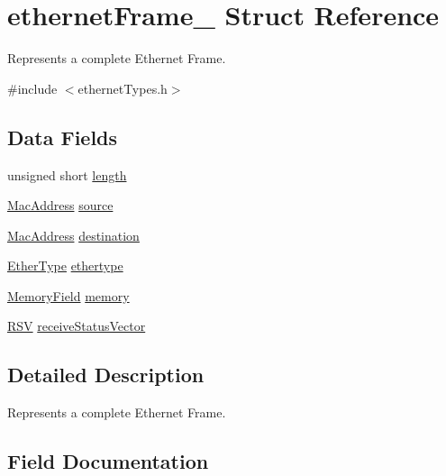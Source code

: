 \hypertarget{structethernet_frame__}{}\section{ethernet\+Frame\+\_\+ Struct Reference}
\label{structethernet_frame__}


Represents a complete Ethernet Frame.  




{\ttfamily \#include $<$ethernet\+Types.\+h$>$}

\subsection*{Data Fields}
\begin{DoxyCompactItemize}
\item 
unsigned short \mbox{\hyperlink{structethernet_frame___a92fb67cb6d873cedc8c09a2d901396a2}{length}}
\item 
\mbox{\hyperlink{ethernet_types_8h_a7fed77396097fa92ca5f4b185844244c}{Mac\+Address}} \mbox{\hyperlink{structethernet_frame___ad921b9c440e49b18b551c1c6bda03dcc}{source}}
\item 
\mbox{\hyperlink{ethernet_types_8h_a7fed77396097fa92ca5f4b185844244c}{Mac\+Address}} \mbox{\hyperlink{structethernet_frame___a55c89de46e499edcb53dcccd41f5618a}{destination}}
\item 
\mbox{\hyperlink{group__ethernet_ga89a11e3f3495bdab0e096c309d6f05a4}{Ether\+Type}} \mbox{\hyperlink{structethernet_frame___ad76bb4c877e40cfcd1182e3dc0e912d4}{ethertype}}
\item 
\mbox{\hyperlink{group__memory_gae2c54b1b1aca949825bf68fe618c8e97}{Memory\+Field}} \mbox{\hyperlink{structethernet_frame___a7dd6a3160ed58904a4699e281fc4617b}{memory}}
\item 
\mbox{\hyperlink{group__rsv_gaf62d44dc83e0d4a835b4f16947bbf34c}{R\+SV}} \mbox{\hyperlink{structethernet_frame___ab267202a16ce0e11bbc65fea2d39d991}{receive\+Status\+Vector}}
\end{DoxyCompactItemize}


\subsection{Detailed Description}
Represents a complete Ethernet Frame. 

\subsection{Field Documentation}
\mbox{\label{structethernet_frame___a55c89de46e499edcb53dcccd41f5618a}} 
